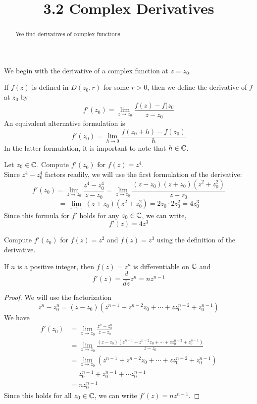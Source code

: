 \documentclass[handout]{ximera}
\title{3.2 Complex Derivatives}
\begin{document}
\begin{abstract}
We find derivatives of complex functions
\end{abstract}

\maketitle



We begin with the derivative of a complex function at $z = z_0$.

\begin{definition}
If $f(z)$ is defined in $D(z_0, r)$ for some $r>0$, then we define the derivative of $f$ at $z_0$ by
\[
f'(z_0) = \lim_{z \to z_0} \frac{f(z) - f(z_0}{z-z_0}
\]
An equivalent alternative formulation is 
\[
f'(z_0) = \lim_{h \to 0} \frac{f(z_0 +h) -f(z_0)}{h}
\]
In the latter formulation, it is important to note that $h\in  \mathbb C$.
\end{definition}

\begin{example}
Let $z_0 \in \mathbb C$. Compute $f'(z_0)$ for $f(z) = z^4$.\\
Since $z^4 - z_0^4$ factors readily, we will use the first formulation of the derivative:
\[
f'(z_0) =\lim_{z \to z_0} \frac{z^4 - z_0^4}{z-z_0} =\lim_{z \to z_0} \frac{(z-z_0)(z+z_0)(z^2+z_0^2)}{z-z_0}
\]
\[
= \lim_{z \to z_0} (z+z_0)(z^2+z_0^2) = 2z_0\cdot 2z_0^2 = 4z_0^3
\]
Since this formula for $f'$ holds for any $z_0 \in \mathbb C$, we can write,
\[
f'(z) = 4z^3
\]
\end{example}


\begin{problem}
Compute $f'(z_0)$ for $f(z) = z^2$ and $f(z) = z^3$ using the definition of the derivative.
\end{problem}

\begin{proposition}
If $n$ is a positive integer, then $f(z) = z^n$ is differentiable on $\mathbb C$ and
\[
f'(z) = \frac{d}{dz} z^n = nz^{n-1}
\]
\end{proposition}

\begin{proof}
We will use the factorization
\[
z^n - z_0^n = (z-z_0)\left(z^{n-1} + z^{n-2}z_0 + \cdots + zz_0^{n-2} + z_0^{n-1} \right)
\]
We have
\begin{align*}
f'(z_0) &= \lim_{z \to z_0} \frac{z^n - z_0^n}{z-z_0} \\
        &=\lim_{z \to z_0} \frac{(z-z_0)\left(z^{n-1} + z^{n-2}z_0 + \cdots + zz_0^{n-2} + z_0^{n-1} \right)}{z-z_0} \\
        &= \lim_{z \to z_0} \left(z^{n-1} + z^{n-2}z_0 + \cdots + zz_0^{n-2} + z_0^{n-1} \right)\\
        & = z_0^{n-1} + z_0^{n-1} + \cdots z_0^{n-1}\\
        & = nz_0^{n-1}
\end{align*}
Since this holds for all $z_0 \in \mathbb C$, we can write $f'(z) = nz^{n-1}$.

\end{proof}
\end{document}
